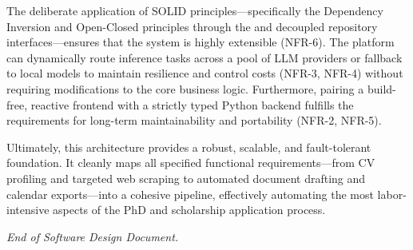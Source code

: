 \documentclass[11pt,a4paper]{article}
\newcommand{\code}[1]{\leavevmode{\color{darkblue}\texttt{#1}}}
\begin{document}
The deliberate application of SOLID principles—specifically the Dependency Inversion and Open-Closed principles through the \code{InferenceProvider} and decoupled repository interfaces—ensures that the system is highly extensible (NFR-6). The platform can dynamically route inference tasks across a pool of LLM providers or fallback to local models to maintain resilience and control costs (NFR-3, NFR-4) without requiring modifications to the core business logic. Furthermore, pairing a build-free, reactive frontend with a strictly typed Python backend fulfills the requirements for long-term maintainability and portability (NFR-2, NFR-5).

Ultimately, this architecture provides a robust, scalable, and fault-tolerant foundation. It cleanly maps all specified functional requirements—from CV profiling and targeted web scraping to automated document drafting and calendar exports—into a cohesive pipeline, effectively automating the most labor-intensive aspects of the PhD and scholarship application process.
\vfill
\begin{center}\small\itshape End of Software Design Document.\end{center}
\end{document}
